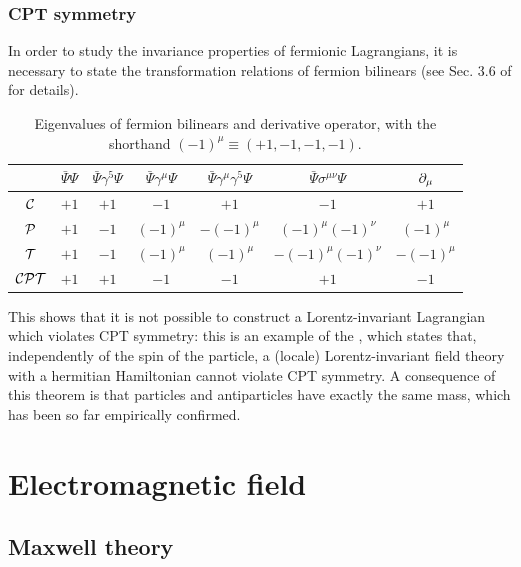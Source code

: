 \subsubsection{CPT symmetry}

In order to study the invariance properties of fermionic Lagrangians, it is necessary to state the transformation relations of fermion bilinears (see Sec. 3.6 of \cite{peskin} for details).

\begin{table}
  \centering
  \begin{tabular}{ccccccc}
    \hline
    \rule{0pt}{2.5ex} & $ \bar{\Psi} \Psi $ & $ \bar{\Psi} \gamma^5 \Psi $ & $ \bar{\Psi} \gamma^\mu \Psi $ & $ \bar{\Psi} \gamma^\mu \gamma^5 \Psi $ & $ \bar{\Psi} \sigma^{\mu \nu} \Psi $ & $ \partial_\mu $ \\
    \hline
    \rule{0pt}{2.5ex} $ \mathcal{C} $ & $ +1 $ & $ +1 $ & $ -1 $ & $ +1 $ & $ -1 $ & $ +1 $ \\
    \rule{0pt}{2.5ex} $ \mathcal{P} $ & $ +1 $ & $ -1 $ & $ (-1)^\mu $ & $ - (-1)^\mu $ & $ (-1)^\mu (-1)^\nu $ & $ (-1)^\mu $ \\
    \rule{0pt}{2.5ex} $ \mathcal{T} $ & $ +1 $ & $ -1 $ & $ (-1)^\mu $ & $ (-1)^\mu $ & $ - (-1)^\mu (-1)^\nu $ & $ - (-1)^\mu $ \\
    \rule{0pt}{2.5ex} $ \mathcal{C}\mathcal{P}\mathcal{T} $ & $ +1 $ & $ +1 $ & $ -1 $ & $ -1 $ & $ +1 $ & $ -1 $
  \end{tabular}
  \caption{Eigenvalues of fermion bilinears and derivative operator, with the shorthand $ (-1)^\mu \equiv (+1,-1,-1,-1) $.}
  \label{tab:ferm-bil-eigen}
\end{table}

This shows that it is not possible to construct a Lorentz-invariant Lagrangian which violates CPT symmetry: this is an example of the , which states that, independently of the spin of the particle, a (locale) Lorentz-invariant field theory with a hermitian Hamiltonian cannot violate CPT symmetry.
A consequence of this theorem is that particles and antiparticles have exactly the same mass, which has been so far empirically confirmed.

\newpage
\section{Electromagnetic field}
\label{sec:qed}

\subsection{Maxwell theory}

